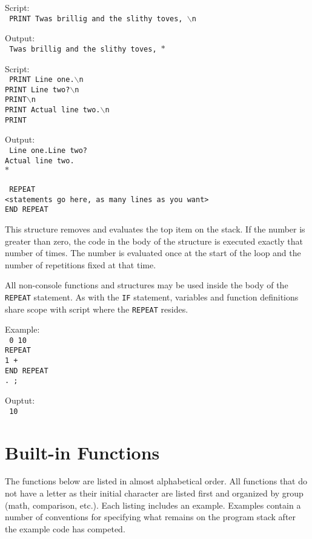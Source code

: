 \noindent Script:\\
\texttt{%
PRINT Twas brillig and the slithy toves, $\backslash$n
}

\noindent Output:\\
\texttt{%
Twas brillig and the slithy toves, $\ast$
}

\noindent Script:\\
\texttt{%
PRINT Line one.$\backslash$n\\
PRINT Line two?$\backslash$n\\
PRINT$\backslash$n\\
PRINT Actual line two.$\backslash$n\\
PRINT
}

\noindent Output:\\
\texttt{%
Line one.Line two?\\
Actual line two.\\
$\ast$
}

\breakline

\noindent\texttt{%
REPEAT\\
<statements go here, as many lines as you want>\\
END REPEAT}

This structure removes and evaluates the top item on the stack. If the number
is greater than zero, the code in the body of the structure is executed exactly
that number of times. The number is evaluated once at the start of the loop
and the number of repetitions fixed at that time.

All non-console functions and structures may be used inside the body of the
\texttt{REPEAT} statement. As with the \texttt{IF} statement, variables and
function definitions share scope with script where the \texttt{REPEAT}
resides.

\noindent Example:\\
\texttt{%
0 10 \\
REPEAT \\
1 +\\
END REPEAT\\
. ;}

Ouptut:\\
\texttt{%
10
}

\section{Built-in Functions}
\label{builtInFunctions}
The functions below are listed in almost alphabetical order. All functions that
do not have a letter as their initial character are listed first and organized
by group (math, comparison, etc.). Each listing includes an example. Examples
contain a number of conventions for specifying what remains on the program stack
after the example code has competed.

